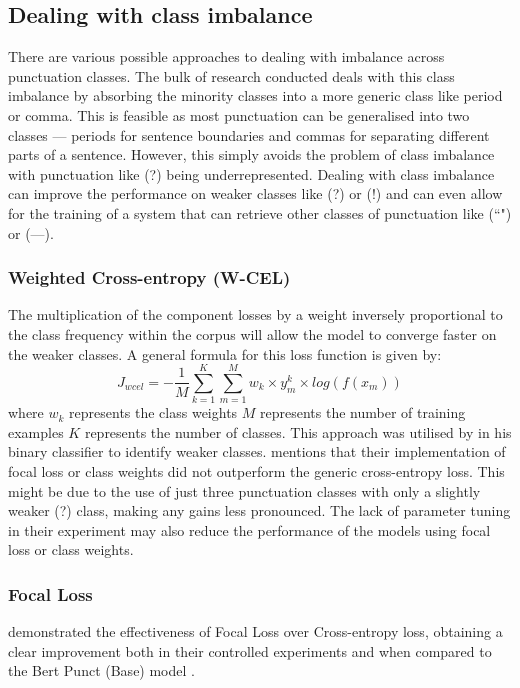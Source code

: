 \documentclass[a4paper]{article}
\begin{document}
\begin{multicols}{2}
\subsection{Dealing with class imbalance}
There are various possible approaches to dealing with imbalance across punctuation classes. The bulk of research conducted deals with this class imbalance by absorbing the minority classes into a more generic class like period or comma. This is feasible as most punctuation can be generalised into two classes --- periods for sentence boundaries and commas for separating different parts of a sentence. However, this simply avoids the problem of class imbalance with punctuation like (?) being underrepresented. Dealing with class imbalance can improve the performance on weaker classes like (?) or (!) and can even allow for the training of a system that can retrieve other classes of punctuation like (``") or (---). 
\subsubsection{Weighted Cross-entropy (W-CEL)}
The multiplication of the component losses by a weight inversely proportional to the class frequency within the corpus will allow the model to converge faster on the weaker classes. A general formula for this loss function is given by: \[
J_{wcel}=-\frac{1}{M}\sum_{k=1}^{K}\sum_{m=1}^{M}w_k \times y_m^k \times log(f(x_m))
\] where $w_k$ represents the class weights \newline
$M$ represents the number of training examples \newline
$K$ represents the number of classes. \newline
This approach was utilised by \cite{adaptivenerunbalanceddata} in his binary classifier to identify weaker classes. \citet{efficientbertrobust} mentions that their implementation of focal loss or class weights did not outperform the generic cross-entropy loss. This might be due to the use of just three punctuation classes with only a slightly weaker (?) class, making any gains less pronounced. The lack of parameter tuning in their experiment may also reduce the performance of the models using focal loss or class weights.

\subsubsection{Focal Loss}
\citet{focallosspunct} demonstrated the effectiveness of Focal Loss over Cross-entropy loss, obtaining a clear improvement both in their controlled experiments and when compared to the Bert Punct (Base) model \citep{pandababa}.


\end{multicols}
\end{document}
